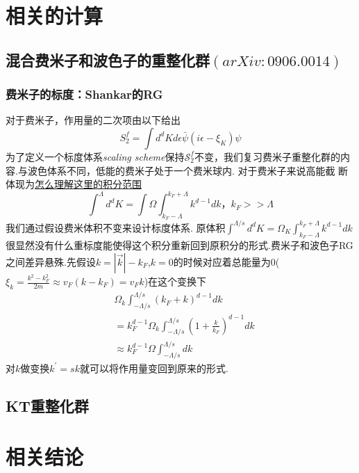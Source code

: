\documentclass{ctexart}
\begin{document}
\section{相关的计算}
\subsection{混合费米子和波色子的重整化群$(arXiv:0906.0014)$}
\subsubsection{费米子的标度：Shankar的RG}
对于费米子，作用量的二次项由以下给出
$$S_2^f=\int d^dKd\epsilon \bar{\psi}(i\epsilon-\xi_{K})\psi$$
为了定义一个标度体系\textit{scaling scheme}保持$\mathcal{S}_2^f$不变，我们复习费米子重整化群的内容.与波色体系不同，低能的费米子处于一个费米球内.
对于费米子来说高能截 断体现为\underline{怎么理解这里的积分范围}
$$\int^\Lambda d^dK=\int \Omega\int_{k_F-\Lambda}^{k_F+\Lambda}k^{d-1}dk，k_F>>\Lambda$$
我们通过假设费米体积不变来设计标度体系.
原体积$\int^{\Lambda/s}d^d K=\Omega_K\int_{k_F-\Lambda}^{k_F+\Lambda}k^{d-1}dk$
很显然没有什么重标度能使得这个积分重新回到原积分的形式.费米子和波色子RG之间差异悬殊.先假设$k=|\vec{k}|-k_F$,$k=0$的时候对应着总能量为0($\xi_k=\frac{k^2-k_F^2}{2m}\approx v_F(k-k_F)=v_F k$)在这个变换下
\begin{align*}
    & \Omega_k\int_{-\Lambda/s}^{\Lambda/s}(k_F+k)^{d-1}dk\\
    & =k_F^{d-1}\Omega_k\int_{-\Lambda/s}^{\Lambda/s}(1+\frac{k}{k_F})^{d-1}dk\\
    & \approx k_F^{d-1}\Omega\int_{-\Lambda/s}^{\Lambda/s}dk
\end{align*}
对$k$做变换$k^\prime=sk$就可以将作用量变回到原来的形式.
\subsection{KT重整化群}
\section{相关结论}
\end{document}
